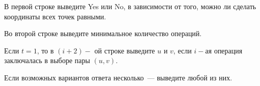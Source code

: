 В первой строке выведите Yes или No, в зависимости от того, можно ли сделать координаты всех точек равными.

Во второй строке выведите минимальное количество операций. 

Если $t = 1$, то в $(i+2)-$ ой строке выведите $u$ и $v$, если $i-$ая операция заключалась в выборе пары $(u,v)$.

Если возможных вариантов ответа несколько~--- выведите любой из них.